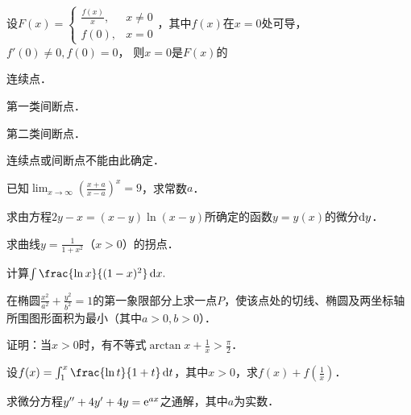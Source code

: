 \documentclass[plain,noanswer,medmath]{../../template/jnuexam}
\begin{document}




\begin{problem}
设$F(x)=\begin{cases}
  \frac{f(x)}{x}, & x \ne 0 \\
            f(0), & x = 0
\end{cases}$，其中$f(x)$在$x=0$处可导，$f'(0)\ne 0,f(0)=0$，
则$x=0$是$F(x)$的\pickout{}
\begin{abcd}
\item 连续点．
\item 第一类间断点．
\item 第二类间断点．
\item 连续点或间断点不能由此确定．
\end{abcd}
\end{problem}




\begin{problem}
已知$\lim_{x\to\infty}\left(\frac{x+a}{x-a}\right)^x=9$，求常数$a$．
\end{problem}


\begin{problem}
求由方程$2y-x=(x-y)\ln(x-y)$所确定的函数$y=y(x)$的微分$\mathop{}\!\mathrm{d} y$．
\end{problem}


\begin{problem}
求曲线$y=\frac{1}{1+x^2}$（$x>0$）的拐点．
\end{problem}


\begin{problem}
计算$\int \frac{\ln x}{(1-x)^2} \dx.$
\end{problem}





\begin{problem}
在椭圆$\frac{x^2}{a^2}+\frac{y^2}{b^2}=1$的第一象限部分上求一点$P$，使该点处的切线、椭圆及两坐标轴所围图形面积为最小（其中$a>0,b>0$）．
\end{problem}



\begin{problem}
证明：当$x>0$时，有不等式$\arctan x+\frac{1}{x}>\frac{\pi}{2}$．
\end{problem}



\begin{problem}
设$f(x)=\int_1^x \frac{\ln t}{1+t} \dt$，其中$x>0$，求$f(x)+f\left(\frac{1}{x} \right)$．
\end{problem}






\begin{problem}
求微分方程$y''+4y'+4y= \mathrm{e}^{ax}$之通解，其中$a$为实数．
\end{problem}
\end{document}

